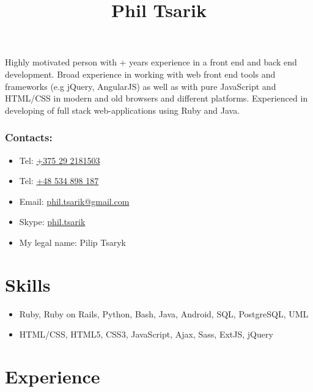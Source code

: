\documentclass[a4paper, 12pt]{article}
\title{Phil Tsarik}
\author{}
\date{}
\newcommand{\defvalue}[2]{\ifx#1\empty#2\else#1\fi}
\newcommand{\yearsexp}{%
    \FPeval{\result}{clip(\the\year - 2011)}%
    \defvalue{\result}{4+}}
\begin{document}
\maketitle

Highly motivated person with \yearsexp{} years experience in a front end and back end development.
Broad experience in working with web front end tools and frameworks (e.g jQuery, AngularJS) as well as with pure JavaScript and HTML/CSS in modern and old browsers and different platforms.
Experienced in developing of full stack web-applications using Ruby and Java.

\subsubsection*{Contacts:}
\begin{itemize}
    \item Tel: \href{tel:+375292181503}{+375 29 2181503}
    \item Tel: \href{tel:+48534898187}{+48 534 898 187}
    \item Email: \href{mailto:phil.tsarik@gmail.com}{phil.tsarik@gmail.com}
    \item Skype: \href{callto:phil.tsarik}{phil.tsarik}
    \item My legal name: Pilip Tsaryk
\end{itemize}


\section*{Skills}

    \begin{itemize}
        \item Ruby, Ruby on Rails, Python, Bash, Java, Android, SQL, PostgreSQL, UML
        \item HTML/CSS, HTML5, CSS3, JavaScript, Ajax, Sass, ExtJS, jQuery
    \end{itemize}


\section*{Experience}
\end{document}
